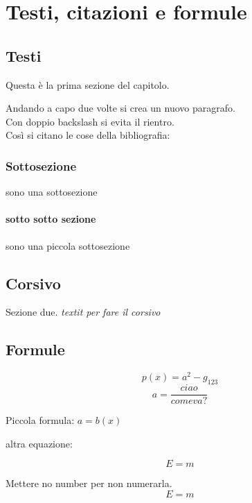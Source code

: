 \chapter{Testi, citazioni e formule}
\label{chap:testi}
\section{Testi}
Questa è la prima sezione del capitolo.

Andando a capo due volte si crea un nuovo paragrafo.
\\
Con doppio backslash si evita il rientro.
\\
Così si citano le cose della bibliografia:

\cite{wikipedia}
\cite{CPP_Primer}
\cite{Computer_Networking_and_the_Internet}
\cite{Ingegneria_del_software}
\cite{Understanding_the_Linux_Kernel}
\cite{Windows_Server_2012}

\subsection{Sottosezione}
sono una sottosezione
\subsubsection{sotto sotto sezione}
sono una piccola sottosezione

\section{Corsivo}
Sezione due. \textit{textit per fare il corsivo} 

\section{Formule}

\[p(x) = a^2 - g_{123}\]
\[a = \frac{ciao}{come va?}\]


Piccola formula: $a=b(x)$

altra equazione:

\begin{equation}
E=m
\end{equation}

Mettere no number per non numerarla.
\begin{equation}
E=m \nonumber
\end{equation}


